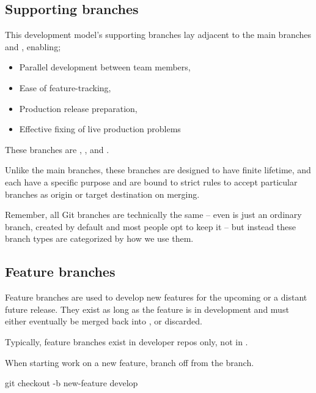 \subsection{Supporting branches}

This development model’s supporting branches lay adjacent to the main branches  and , enabling;

\begin{itemize}
	\item Parallel development between team members,
	\item Ease of feature-tracking,
	\item Production release preparation,
	\item Effective fixing of live production problems
\end{itemize}

\noindent These branches are , , and . \newline

Unlike the main branches, these branches are designed to have finite lifetime, and each have a specific purpose and are bound to strict rules to accept particular branches as origin or target destination on merging.

Remember, all Git branches are technically the same – even  is just an ordinary branch, created by default and most people opt to keep it – but instead these branch types are categorized by how we use them.



\subsection{Feature branches}

Feature branches are used to develop new features for the upcoming or a distant future release. They exist as long as the feature is in development and must either eventually be merged back into , or discarded. \newline

\noindent Typically, feature branches exist in developer repos only, not in . \newline

\noindent When starting work on a new feature, branch off from the  branch.

\begin{git-bash}
    git checkout -b new-feature develop
\end{git-bash}

